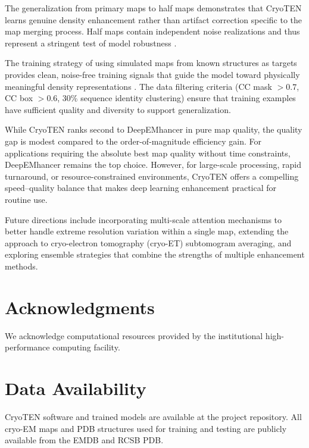 \documentclass[11pt]{article}
\begin{document}
The generalization from primary maps to half maps demonstrates that CryoTEN learns genuine density enhancement rather than artifact correction specific to the map merging process. Half maps contain independent noise realizations and thus represent a stringent test of model robustness \citep{Scheres2012,Henderson2013}.

The training strategy of using simulated maps from known structures as targets provides clean, noise-free training signals that guide the model toward physically meaningful density representations \citep{SanchezGarcia2021}. The data filtering criteria (CC mask $> 0.7$, CC box $> 0.6$, 30\% sequence identity clustering) ensure that training examples have sufficient quality and diversity to support generalization.

While CryoTEN ranks second to DeepEMhancer in pure map quality, the quality gap is modest compared to the order-of-magnitude efficiency gain. For applications requiring the absolute best map quality without time constraints, DeepEMhancer remains the top choice. However, for large-scale processing, rapid turnaround, or resource-constrained environments, CryoTEN offers a compelling speed--quality balance that makes deep learning enhancement practical for routine use.

Future directions include incorporating multi-scale attention mechanisms to better handle extreme resolution variation within a single map, extending the approach to cryo-electron tomography (cryo-ET) subtomogram averaging, and exploring ensemble strategies that combine the strengths of multiple enhancement methods.

\section*{Acknowledgments}
We acknowledge computational resources provided by the institutional high-performance computing facility.

\section*{Data Availability}
CryoTEN software and trained models are available at the project repository. All cryo-EM maps and PDB structures used for training and testing are publicly available from the EMDB and RCSB PDB.



\end{document}
